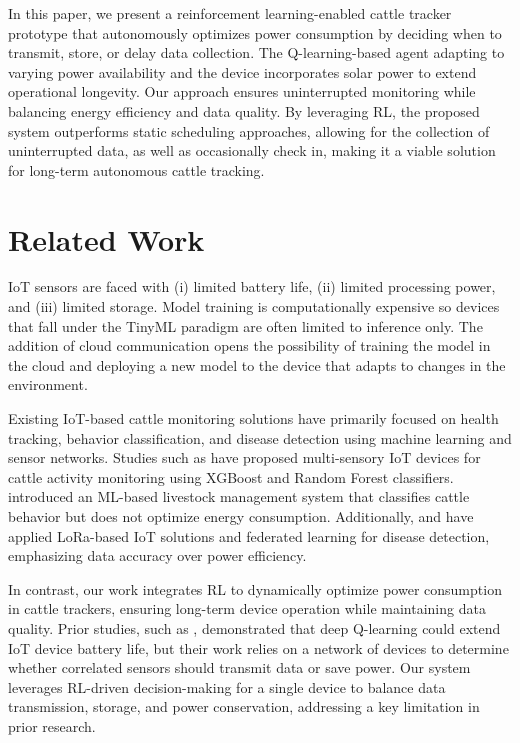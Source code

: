 \documentclass[10pt]{cai}
\begin{document}
In this paper, we present a reinforcement learning-enabled cattle tracker prototype that autonomously optimizes power consumption by deciding when to transmit, store, or delay data collection.
The Q-learning-based agent adapting to varying power availability and the device incorporates solar power to extend operational longevity.
Our approach ensures uninterrupted monitoring while balancing energy efficiency and data quality. 
By leveraging RL, the proposed system outperforms static scheduling approaches, allowing for the collection of uninterrupted data, as well as occasionally check in, making it a viable solution for long-term autonomous cattle tracking.

\section{Related Work}
IoT sensors are faced with (i) limited battery life, (ii) limited processing power, and (iii) limited storage\cite{chenDeepReinforcementLearning2021}.
Model training is computationally expensive so devices that fall under the TinyML paradigm are often limited to inference only\cite{rayReviewTinyMLStateoftheart2022}.
The addition of cloud communication opens the possibility of training the model in the cloud and deploying a new model to the device that adapts to changes in the environment.

Existing IoT-based cattle monitoring solutions have primarily focused on health tracking, behavior classification, and disease detection using machine learning and sensor networks. 
Studies such as \cite{duttaMOOnitorIoTBased2022} have proposed multi-sensory IoT devices for cattle activity monitoring using XGBoost and Random Forest classifiers. 
\cite{yamsaniIoTBasedLivestockMonitoring2024} introduced an ML-based livestock management system that classifies cattle behavior but does not optimize energy consumption. 
Additionally, \cite{arshadFederatedLearningModel2024} and \cite{iRealTimeCattle2024} have applied LoRa-based IoT solutions and federated learning for disease detection, emphasizing data accuracy over power efficiency.

In contrast, our work integrates RL to dynamically optimize power consumption in cattle trackers, ensuring long-term device operation while maintaining data quality. 
Prior studies, such as \cite{hribarUsingDeepQLearning2019}, demonstrated that deep Q-learning could extend IoT device battery life, but their work relies on a network of devices to determine whether correlated sensors should transmit data or save power.
Our system leverages RL-driven decision-making for a single device to balance data transmission, storage, and power conservation, addressing a key limitation in prior research.
\end{document}
